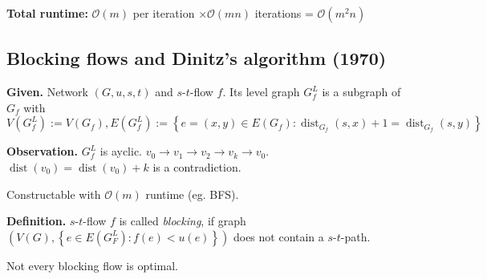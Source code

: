 \documentclass[a4paper]{article}
\theoremstyle{definition}
\newcommand{\set}[1]{\left\{#1\right\}}
\newcommand{\given}[1]{\textbf{Given.} #1\par}
\newcommand{\gath}[2]{$#1$-$#2$-path} %
\begin{document}
\textbf{Total runtime:}
  $\mathcal{O}(m)$ per iteration $\times \mathcal{O}(mn)$ iterations = $\mathcal{O}(m^2n)$

\subsection{Blocking flows and Dinitz's algorithm (1970)}
%
\given{Network $(G, u, s, t)$ and $s$-$t$-flow $f$. Its level graph $G_f^L$ is a subgraph of $G_f$ with
\[
  V(G_f^L) := V(G_f), E(G_f^L) := \set{e = (x, y) \in E(G_f):
    \operatorname{dist}_{G_f}(s, x) + 1 = \operatorname{dist}_{G_f}(s, y)
  }
\]}

\textbf{Observation.}
  $G_f^L$ is ayclic. $v_0 \rightarrow v_1 \rightarrow v_2 \rightarrow v_k \rightarrow v_0$. $\operatorname{dist}(v_0) = \operatorname{dist}(v_0) + k$ is a contradiction.

Constructable with $\mathcal{O}(m)$ runtime (eg. BFS).

\textbf{Definition.} $s$-$t$-flow $f$ is called \emph{blocking}, if graph $(V(G), \set{e \in E(G_F^L): f(e) < u(e)})$ does not contain a \gath st.

\clearpage
Not every blocking flow is optimal.
\end{document}
